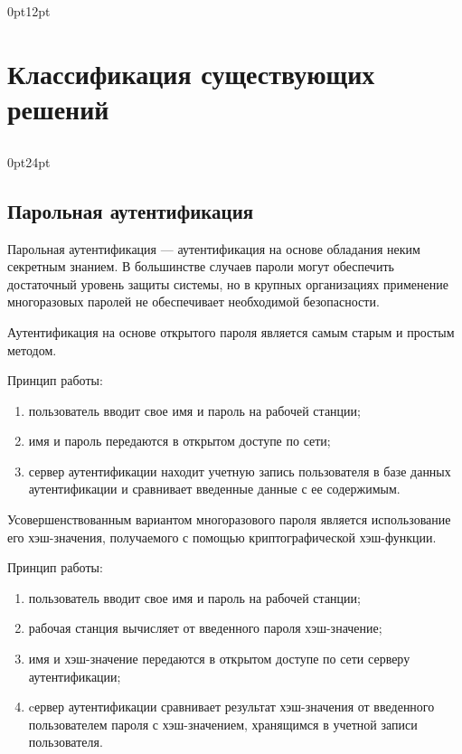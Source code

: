\titlespacing\section{\parindent}{0pt}{12pt}
\section{Классификация существующих решений}
\titlespacing\subsection{\parindent}{0pt}{24pt}
\subsection{Парольная аутентификация}
Парольная аутентификация \cite{bib2} --- аутентификация на основе обладания неким секретным знанием. 
В большинстве случаев пароли могут обеспечить достаточный уровень защиты системы, но в крупных организациях применение многоразовых паролей не обеспечивает необходимой безопасности.

Аутентификация на основе открытого пароля является самым старым и простым методом.

Принцип работы:

\begin{enumerate}
    \item пользователь вводит свое имя и пароль на рабочей станции;
    \item имя и пароль передаются в открытом доступе по сети;
    \item сервер аутентификации находит учетную запись пользователя в базе данных аутентификации и сравнивает введенные данные с ее содержимым. 
\end{enumerate}

Усовершенствованным вариантом многоразового пароля является использование его хэш-значения, получаемого с помощью криптографической хэш-функции.

Принцип работы:
\begin{enumerate}
    \item пользователь вводит свое имя и пароль на рабочей станции;
    \item рабочая станция вычисляет от введенного пароля хэш-значение;
    \item имя и хэш-значение передаются в открытом доступе по сети серверу аутентификации;
    \item cервер аутентификации сравнивает результат хэш-значения от введенного пользователем пароля с хэш-значением, хранящимся в учетной записи пользователя. 
\end{enumerate}

